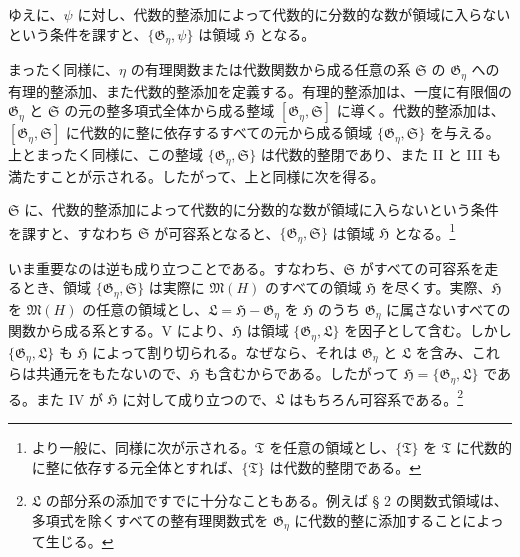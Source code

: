 ゆえに、$\psi$ に対し、代数的整添加によって代数的に分数的な数が領域に入らないという条件を課すと、$\{\mathfrak G_\eta,\psi\}$ は領域 $\mathfrak H$ となる。

まったく同様に、$\eta$ の有理関数または代数関数から成る任意の系 $\mathfrak S$ の $\mathfrak G_\eta$ への有理的整添加、また代数的整添加を定義する。有理的整添加は、一度に有限個の $\mathfrak G_\eta$ と $\mathfrak S$ の元の整多項式全体から成る整域 $[\mathfrak G_\eta,\mathfrak S]$ に導く。代数的整添加は、$[\mathfrak G_\eta,\mathfrak S]$ に代数的に整に依存するすべての元から成る領域 $\{\mathfrak G_\eta,\mathfrak S\}$ を与える。上とまったく同様に、この整域 $\{\mathfrak G_\eta,\mathfrak S\}$ は代数的整閉であり、また II と III も満たすことが示される。したがって、上と同様に次を得る。

$\mathfrak S$ に、代数的整添加によって代数的に分数的な数が領域に入らないという条件を課すと、すなわち $\mathfrak S$ が可容系となると、$\{\mathfrak G_\eta,\mathfrak S\}$ は領域 $\mathfrak H$ となる。\footnote{より一般に、同様に次が示される。$\mathfrak T$ を任意の領域とし、$\{\mathfrak T\}$ を $\mathfrak T$ に代数的に整に依存する元全体とすれば、$\{\mathfrak T\}$ は代数的整閉である。}

いま重要なのは逆も成り立つことである。すなわち、$\mathfrak S$ がすべての可容系を走るとき、領域 $\{\mathfrak G_\eta,\mathfrak S\}$ は実際に $\mathfrak M(H)$ のすべての領域 $\mathfrak H$ を尽くす。実際、$\mathfrak H$ を $\mathfrak M(H)$ の任意の領域とし、$\mathfrak L=\mathfrak H-\mathfrak G_\eta$ を $\mathfrak H$ のうち $\mathfrak G_\eta$ に属さないすべての関数から成る系とする。V により、$\mathfrak H$ は領域 $\{\mathfrak G_\eta,\mathfrak L\}$ を因子として含む。しかし $\{\mathfrak G_\eta,\mathfrak L\}$ も $\mathfrak H$ によって割り切られる。なぜなら、それは $\mathfrak G_\eta$ と $\mathfrak L$ を含み、これらは共通元をもたないので、$\mathfrak H$ も含むからである。したがって $\mathfrak H=\{\mathfrak G_\eta,\mathfrak L\}$ である。また IV が $\mathfrak H$ に対して成り立つので、$\mathfrak L$ はもちろん可容系である。\footnote{$\mathfrak L$ の部分系の添加ですでに十分なこともある。例えば § 2 の関数式領域は、多項式を除くすべての整有理関数式を $\mathfrak G_\eta$ に代数的整に添加することによって生じる。}

